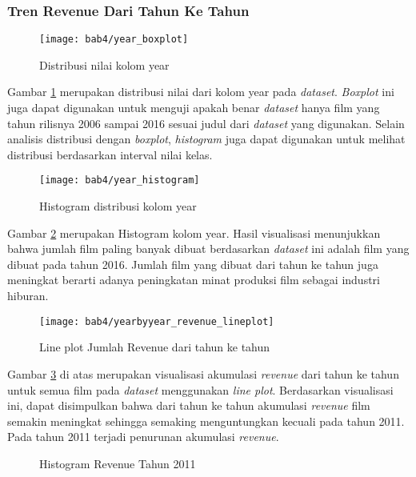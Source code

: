 \subsubsection{Tren Revenue Dari Tahun Ke Tahun}
\begin{figure}[H]
	\centering  
	\texttt{[image: bab4/year\_boxplot]}   
	\caption{Distribusi nilai kolom year}
	\label{fig:year_boxplot} 
\end{figure} 

Gambar \ref{fig:year_boxplot} merupakan distribusi nilai dari kolom year pada \textit{dataset}. \textit{Boxplot} ini juga dapat digunakan untuk menguji apakah benar \textit{dataset} hanya film yang tahun rilisnya 2006 sampai 2016 sesuai judul dari \textit{dataset} yang digunakan. Selain analisis distribusi dengan \textit{boxplot}, \textit{histogram} juga dapat digunakan untuk melihat distribusi berdasarkan interval nilai kelas. 


\begin{figure}[H]
	\centering  
	\texttt{[image: bab4/year\_histogram]}   
	\caption{Histogram distribusi kolom year }
	\label{fig:year_histogram} 
\end{figure} 

Gambar \ref{fig:year_histogram} merupakan Histogram kolom year. Hasil visualisasi menunjukkan bahwa jumlah film paling banyak dibuat berdasarkan \textit{dataset} ini adalah film yang dibuat pada tahun 2016. Jumlah film yang dibuat dari tahun ke tahun juga meningkat berarti adanya peningkatan minat produksi film sebagai industri hiburan. 


\begin{figure}[H]
	\centering  
	\texttt{[image: bab4/yearbyyear\_revenue\_lineplot]}   
	\caption{Line plot Jumlah Revenue dari tahun ke tahun}
	\label{fig:yearbyyear_revenue_lineplot} 
\end{figure} 

Gambar \ref{fig:yearbyyear_revenue_lineplot} di atas merupakan visualisasi akumulasi  \textit{revenue} dari tahun ke tahun untuk semua film pada \textit{dataset} menggunakan \textit{line plot}. Berdasarkan visualisasi ini, dapat disimpulkan bahwa dari tahun ke tahun akumulasi \textit{revenue} film semakin meningkat sehingga semaking menguntungkan kecuali pada tahun 2011. Pada tahun 2011 terjadi penurunan akumulasi \textit{revenue}. 

\begin{figure}[H]
    \centering
    \qquad
    \caption{Histogram Revenue Tahun 2011}%
    \label{fig:revenue_histogram_2010_2011}%
\end{figure}

